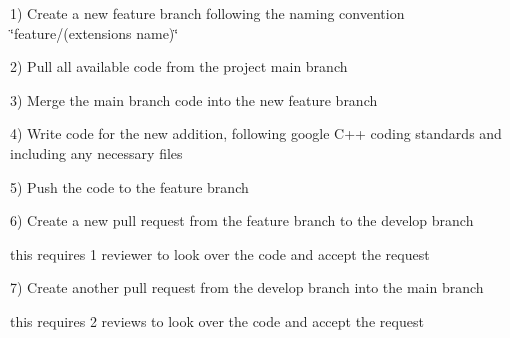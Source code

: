 \begin{DoxyItemize}
\item 1) Create a new feature branch following the naming convention \char`\"{}feature/(extension\textquotesingle{}s name)\char`\"{} ~\newline

\item 2) Pull all available code from the project main branch ~\newline

\item 3) Merge the main branch code into the new feature branch ~\newline

\item 4) Write code for the new addition, following google C++ coding standards and including any necessary files ~\newline

\item 5) Push the code to the feature branch ~\newline

\item 6) Create a new pull request from the feature branch to the develop branch ~\newline

\begin{DoxyItemize}
\item this requires 1 reviewer to look over the code and accept the request ~\newline

\end{DoxyItemize}
\item 7) Create another pull request from the develop branch into the main branch ~\newline

\begin{DoxyItemize}
\item this requires 2 reviews to look over the code and accept the request ~\newline

\end{DoxyItemize}
\end{DoxyItemize}